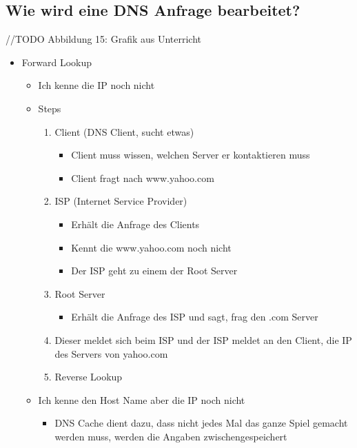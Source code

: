 \subsection*{Wie wird eine DNS Anfrage bearbeitet?}
//TODO Abbildung 15: Grafik aus Unterricht
\begin{itemize}
    \item Forward Lookup
    \begin{itemize}
        \item Ich kenne die IP noch nicht
        \item Steps
        \begin{enumerate}
            \item Client (DNS Client, sucht etwas)
            \begin{itemize}
                \item Client muss wissen, welchen Server er kontaktieren muss
                \item Client fragt nach www.yahoo.com
            \end{itemize}
            \item ISP (Internet Service Provider)
            \begin{itemize}
                \item Erhält die Anfrage des Clients
                \item Kennt die www.yahoo.com noch nicht
                \item Der ISP geht zu einem der Root Server
            \end{itemize}
            \item Root Server
            \begin{itemize}
                \item Erhält die Anfrage des ISP und sagt, frag den .com Server
            \end{itemize}
            \item Dieser meldet sich beim ISP und der ISP meldet an den Client, die IP des Servers von yahoo.com
            \item Reverse Lookup
        \end{enumerate}
        \item Ich kenne den Host Name aber die IP noch nicht
        \begin{itemize}
            \item DNS Cache dient dazu, dass nicht jedes Mal das ganze Spiel gemacht werden muss, werden die Angaben zwischengespeichert
        \end{itemize}
    \end{itemize}
\end{itemize}

